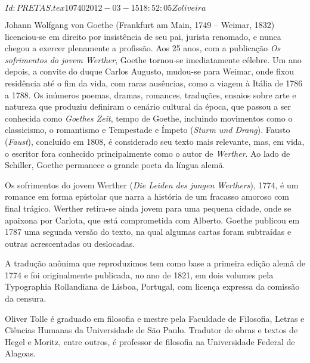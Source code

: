 \SVN $Id: PRETAS.tex 10740 2012-03-15 18:52:05Z oliveira $
\begin{resumopage}

\item[Johann Wolfgang von Goethe] (Frankfurt am Main, 1749 -- Weimar, 1832)
licenciou-se em direito por insistência de seu pai, jurista renomado, e nunca
chegou a exercer plenamente a profissão.  Aos 25 anos, com a publicação
\textit{Os sofrimentos do jovem Werther}, Goethe tornou-se imediatamente
célebre. Um ano depois, a convite do duque Carlos Augusto, mudou-se para
Weimar, onde fixou residência até o fim da vida, com raras ausências, como a
viagem à Itália de 1786 a 1788. Os inúmeros poemas, dramas, romances,
traduções, ensaios sobre arte e natureza que produziu definiram o cenário
cultural da época, que passou a ser conhecida como \textit{Goethes Zeit}, tempo
de Goethe, incluindo movimentos como o classicismo, o romantismo e Tempestade e
Ímpeto (\textit{Sturm und Drang}). Fausto (\textit{Faust}), concluído em 1808,
é considerado seu texto mais relevante, mas, em vida, o escritor fora conhecido
principalmente como o autor de \textit{Werther}.  Ao lado de Schiller, Goethe
permanece o grande poeta da língua alemã.

\item[Os sofrimentos do jovem Werther] (\textit{Die Leiden des jungen Werthers}),
1774, é um romance em forma epistolar que narra a história
de um fracasso amoroso com final trágico. Werther retira-se ainda
jovem para uma pequena cidade, onde se apaixona por Carlota,
que está comprometida com Alberto. Goethe publicou
em 1787 uma segunda versão do texto, na qual algumas cartas
foram subtraídas e outras acrescentadas ou deslocadas.

\item[A tradução anônima] que reproduzimos tem como base a primeira
edição alemã de 1774 e foi originalmente publicada, no ano de
1821, em dois volumes pela Typographia Rollandiana de Lisboa,
Portugal, com licença expressa da comissão da censura.

\item[Oliver Tolle] é graduado em filosofia e mestre pela Faculdade de
Filosofia, Letras e Ciências Humanas da Universidade de São Paulo.
Tradutor de obras e textos de Hegel e Moritz, entre outros,
é professor de filosofia na Universidade Federal de Alagoas.

\end{resumopage}


